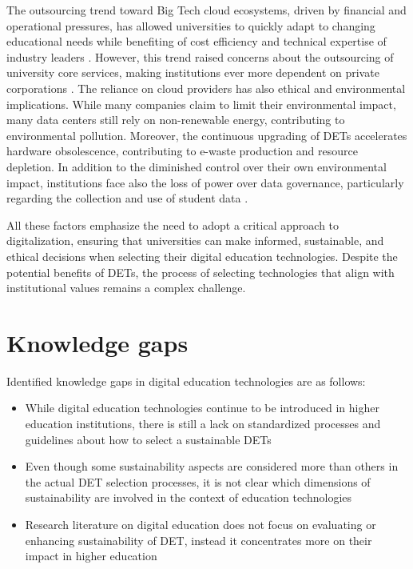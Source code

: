 The outsourcing trend toward Big Tech cloud ecosystems, driven by financial and operational pressures, has allowed universities to quickly adapt to changing educational needs while benefiting of cost efficiency and technical expertise of industry leaders \cite{komljenovic_rise_2021}. However, this trend raised concerns about the outsourcing of university core services, making institutions ever more dependent on private corporations \cite{angeli_conceptualising_2022}. The reliance on cloud providers has also ethical and environmental implications. While many companies claim to limit their environmental impact, many data centers still rely on non-renewable energy, contributing to environmental pollution. Moreover, the continuous upgrading of DETs accelerates hardware obsolescence, contributing to e-waste production and resource depletion. In addition to the diminished control over their own environmental impact, institutions face also the loss of power over data governance, particularly regarding the collection and use of student data \cite{komljenovic_rise_2021}.

All these factors emphasize the need to adopt a critical approach to digitalization, ensuring that universities can make informed, sustainable, and ethical decisions when selecting their digital education technologies. Despite the potential benefits of DETs, the process of selecting technologies that align with institutional values remains a complex challenge.


\section{Knowledge gaps}
Identified knowledge gaps in digital education technologies are as follows:
\begin{itemize}[noitemsep, topsep=4pt, parsep=0pt, partopsep=0pt]
\item While digital education technologies continue to be introduced in higher education institutions, there is still a lack on standardized processes and guidelines about how to select a sustainable DETs 
\item Even though some sustainability aspects are considered more than others in the actual DET selection processes, it is not clear which dimensions of sustainability are involved in the context of education technologies
\item Research literature on digital education does not focus on evaluating or enhancing sustainability of DET, instead it concentrates more on their impact in higher education
\end{itemize}

